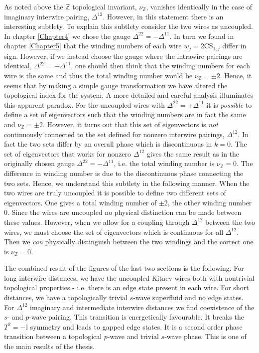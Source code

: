 As noted above the $\mathbb{Z}$ topological invariant, $\nu_{\mathbb{Z}}$, vanishes identically in the case of imaginary interwire pairing, $\Delta^{12}$. However, in this statement there is an interesting subtlety. To explain this subtlety consider the two wires as uncoupled. In chapter \ref{Chapter4} we chose the gauge $\Delta^{22} = - \Delta^{11}$. In turn we found in chapter \ref{Chapter5} that the winding numbers of each wire $w_j = 2\text{CS}_{1,j}$ differ in sign. However, if we instead choose the gauge where the intrawire pairings are identical, $\Delta^{22} = + \Delta^{11}$, one should then think that the winding numbers for each wire is the same and thus the total winding number would be $\nu_{\mathbb{Z}} = \pm 2$. Hence, it seems that by making a simple gauge transformation we have altered the topological index for the system. A more detailed and careful analysis illuminates this apparent paradox. For the uncoupled wires with $\Delta^{22} = + \Delta^{11}$ it is \textit{possible} to define a set of eigenvectors such that the winding numbers are in fact the same and $\nu_{\mathbb{Z}} = \pm 2$. However, it turns out that this set of eigenvectors is \textit{not} continuously connected to the set defined for nonzero interwire pairings, $\Delta^{12}$. In fact the two sets differ by an overall phase which is discontinuous in $k = 0$. The set of eigenvectors that works for nonzero $\Delta^{12}$ gives the same result as in the originally chosen gauge $\Delta^{22} = - \Delta^{11}$, i.e. the total winding number is $\nu_{\mathbb{Z}} = 0$. The difference in winding number is due to the discontinuous phase connecting the two sets. Hence, we understand this subtlety in the following manner. When the two wires are truly uncoupled it is possible to define two different sets of eigenvectors. One gives a total winding number of $\pm 2$, the other winding number $0$. Since the wires are uncoupled no physical distinction can be made between these values. However, when we allow for a coupling through $\Delta^{12}$ between the two wires, we must choose the set of eigenvectors which is continuous for all $\Delta^{12}$. Then we \textit{can} physically distinguish between the two windings and the correct one is $\nu_{\mathbb{Z}} = 0$. 

The combined result of the figures of the last two sections is the following. For long interwire distances, we have the uncoupled Kitaev wires both with nontrivial topological properties - i.e. there is an edge state present in each wire. For short distances, we have a topologically trivial $s$-wave superfluid and no edge states. For $\Delta^{12}$ imaginary and intermediate interwire distances we find coexistence of the $s$- and $p$-wave pairing. This transition is energetically favourable. It breaks the $T^2 = -\mathbb{I}$ symmetry and leads to gapped edge states. It is a second order phase transition between a topological $p$-wave and trivial $s$-wave phase. This is one of the main results of the thesis. 

